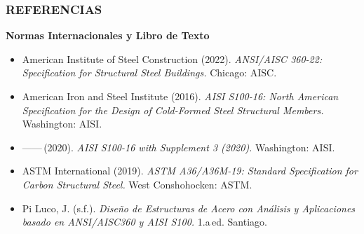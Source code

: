 \documentclass[11.5pt,aspectratio=169,handout]{beamer}
\newcommand{\ctitle}[1]{\frametitle{#1}}
\begin{document}
\begin{frame}
\ctitle{REFERENCIAS}
\vspace{-1mm}
\scriptsize\textbf{Normas Internacionales y Libro de Texto}\\[1mm]
\begin{itemize}\scriptsize\setlength{\itemsep}{0.5mm}
  \item American Institute of Steel Construction (2022). \textit{ANSI/AISC
        360-22: Specification for Structural Steel Buildings.}
        Chicago: AISC.
  \item American Iron and Steel Institute (2016). \textit{AISI S100-16:
        North American Specification for the Design of Cold-Formed Steel
        Structural Members.} Washington: AISI.
  \item ——\,(2020). \textit{AISI S100-16 with Supplement 3 (2020).}
        Washington: AISI.
  \item ASTM International (2019). \textit{ASTM A36/A36M-19: Standard
        Specification for Carbon Structural Steel.}
        West Conshohocken: ASTM.
  \item Pi Luco, J. (s.f.). \textit{Diseño de Estructuras de Acero con
        Análisis y Aplicaciones basado en ANSI/AISC360 y AISI S100.}
        1.a\,ed. Santiago.
\end{itemize}
\end{frame}

\begin{frame}[plain]
  \titlepage
\end{frame}
\end{document}
